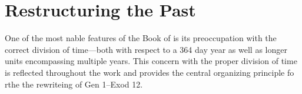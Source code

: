 
\section{Restructuring the Past}

One of the most nable features of the Book of \jub is its preoccupation with the correct division of time---both with respect to a 364 day year as well as longer units encompassing multiple years. This concern with the proper division of time is reflected throughout the work and provides the central organizing principle fo rthe the rewriteing of Gen 1--Exod 12.

